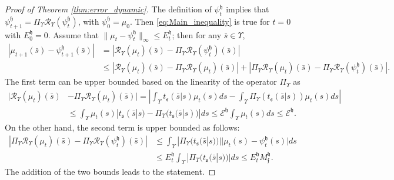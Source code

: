 \documentclass{LMCS}
\begin{document}
\begin{proof}[Proof of Theorem \ref{thm:error_dynamic}]
The definition of $\psi_t^{\mathfrak h}$ implies that $\psi_{t+1}^{\mathfrak h} = \Pi_\Upsilon\mathcal R_\Upsilon(\psi_t^{\mathfrak h})$, 
with $\psi_0^{\mathfrak h} = \mu_0$. 
Then \eqref{eq:Main_inequality} is true for $t=0$ with $E_0^{\mathfrak h} = 0$. 
Assume that $\|\mu_t-\psi_t^{\mathfrak h}\|_\infty\le E_t^{\mathfrak h}$; 
then for any $\bar s\in\Upsilon$, 
\begin{align*}
|\mu_{t+1}(\bar s)-\psi_{t+1}^{\mathfrak h}(\bar s)| & = |\mathcal R_\Upsilon(\mu_t)(\bar s)
-\Pi_\Upsilon\mathcal R_\Upsilon(\psi_t^{\mathfrak h})(\bar s)|\\
& \le |\mathcal R_\Upsilon(\mu_t)(\bar s)-\Pi_\Upsilon\mathcal R_\Upsilon(\mu_t)(\bar s)|
+ |\Pi_\Upsilon\mathcal R_\Upsilon(\mu_t)(\bar s) - \Pi_\Upsilon\mathcal R_\Upsilon(\psi_t^{\mathfrak h})(\bar s)|.
\end{align*}
The first term can be upper bounded based on the linearity of the operator $\Pi_\Upsilon$ as 
\begin{align*}
|\mathcal R_\Upsilon(\mu_t)(\bar s) & - \Pi_\Upsilon\mathcal R_\Upsilon(\mu_t)(\bar s)|
= \left|\int_\Upsilon t_{\mathfrak s}(\bar s|s)\mu_t(s)ds-\int_\Upsilon\Pi_\Upsilon(t_{\mathfrak s}(\bar s|s))\mu_t(s)ds\right|\\
& \le \int_\Upsilon \mu_t(s)|t_{\mathfrak s}(\bar s|s)-\Pi_\Upsilon(t_{\mathfrak s}(\bar s|s))|ds
\le \mathcal E^{\mathfrak h}\int_\Upsilon \mu_t(s)ds
\le \mathcal E^{\mathfrak h}.
\end{align*}
On the other hand, the second term is upper bounded as follows: 
\begin{align*}
|\Pi_\Upsilon\mathcal R_\Upsilon(\mu_t)(\bar s)-\Pi_\Upsilon\mathcal R_\Upsilon(\psi_t^{\mathfrak h})(\bar s)|
& \le \int_\Upsilon |\Pi_\Upsilon(t_{\mathfrak s}(\bar s|s))||\mu_t(s)-\psi_t^{\mathfrak h}(s)|ds\\
& \le E_t^{\mathfrak h}\int_\Upsilon |\Pi_\Upsilon(t_{\mathfrak s}(\bar s|s))|ds
\le E_t^{\mathfrak h}M_{\mathfrak f}^{\mathfrak h}. 
\end{align*}
The addition of the two bounds leads to the statement. 
\end{proof}
\end{document}
